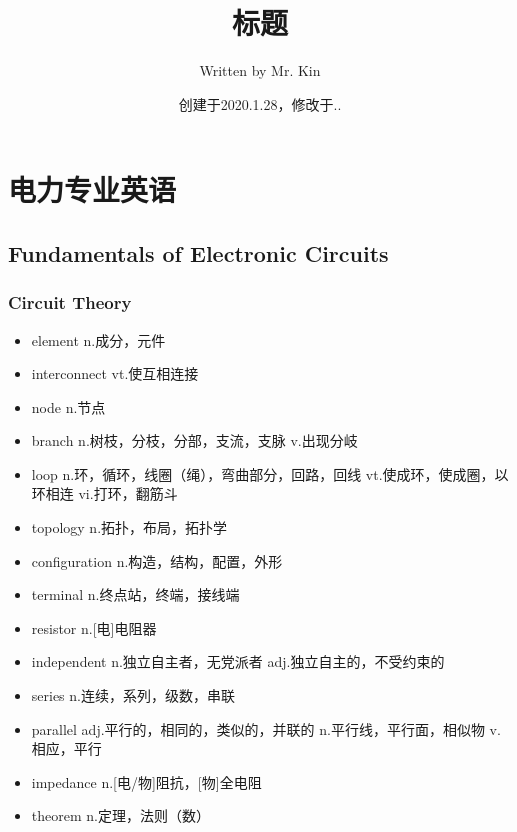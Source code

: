 \documentclass[11pt,a4paper,UTF8,titlepage]{ctexrep} %
\title{\hypertarget{title}{\textbf{标题}}}
\author{Written by Mr. Kin}
\date{创建于2020.1.28，修改于\number\year.\number\month.\number\day}
\makeatletter
\renewcommand{\tableofcontents}%
  {\chapter{\contentsname}%
  \@mkboth{\MakeUppercase\contentsname}{\MakeUppercase\contentsname}%
  \@makeschapterhead{\sourcecodename}%
  \@starttoc{toc}%
}
\makeatother
\begin{document}
    \maketitle %
    {\centering \tableofcontents} %
    \clearpage %
    \fi

    \chapter{电力专业英语}
    \section{Fundamentals of Electronic Circuits}
    \subsection{Circuit Theory}
    \begin{multicols}{2}
        \begin{itemize}
            \item element n.成分，元件
            \item interconnect vt.使互相连接
            \item node n.节点
            \item branch n.树枝，分枝，分部，支流，支脉 v.出现分岐
            \item loop n.环，循环，线圈（绳），弯曲部分，回路，回线 vt.使成环，使成圈，以环相连 vi.打环，翻筋斗
            \item topology n.拓扑，布局，拓扑学
            \item configuration n.构造，结构，配置，外形
            \item terminal n.终点站，终端，接线端
            \item resistor n.[电]电阻器
            \item independent n.独立自主者，无党派者 adj.独立自主的，不受约束的
            \item series n.连续，系列，级数，串联
            \item parallel adj.平行的，相同的，类似的，并联的 n.平行线，平行面，相似物 v.相应，平行
            \item impedance n.[电/物]阻抗，[物]全电阻
            \item theorem n.定理，法则（数）
        \end{itemize}
    \end{multicols}
\end{document}
